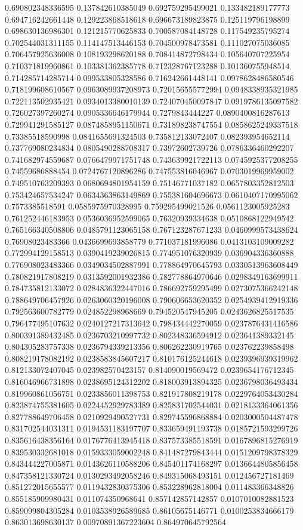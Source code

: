 \begin{table}
\begin{tabu}
\begin{sparkline}{10}
0.690802348336595 0.137842610385049 0.692759295499021 0.133482189177773 0.694716242661448 0.129223868518618 0.696673189823875 0.125119796198899 0.698630136986301 0.121215770625833 0.700587084148728 0.117549235795274 0.702544031311155 0.114147513446153 0.704500978473581 0.111027075036085 0.706457925636008 0.108193298620188 0.708414872798434 0.105640707225954 0.710371819960861 0.103381362385778 0.712328767123288 0.101360755948514 0.714285714285714 0.099533805328586 0.716242661448141 0.0978628486580546 0.718199608610567 0.0963089937208973 0.720156555772994 0.0948338935321985 0.722113502935421 0.0934013380010139 0.724070450097847 0.0919786135097582 0.726027397260274 0.0905336646179944 0.7279843444227 0.0890400816287613 0.729941291585127 0.0874858951150671 0.731898238747554 0.0858625249337518 0.73385518590998 0.0841655691324503 0.735812133072407 0.082393954652114 0.737769080234834 0.0805490288708317 0.73972602739726 0.0786336460292207 0.741682974559687 0.0766479971751748 0.743639921722113 0.0745925377208255 0.74559686888454 0.0724767120896286 0.747553816046967 0.0703019969959002 0.749510763209393 0.0680694801954159 0.75146771037182 0.0657803352812503 0.753424657534247 0.0634363863149869 0.755381604696673 0.0610407170995062 0.7573385518591 0.0585975970328995 0.759295499021526 0.0561123005925283 0.761252446183953 0.0536036952599065 0.76320939334638 0.0510868122949542 0.765166340508806 0.0485791123065158 0.767123287671233 0.0460999573438624 0.76908023483366 0.0436699693858779 0.771037181996086 0.0413103109009282 0.772994129158513 0.0390419239026815 0.774951076320939 0.036904336360888 0.776908023483366 0.0349034502887991 0.778864970645793 0.0330513963608449 0.780821917808219 0.0313592001932386 0.782778864970646 0.0298349163699911 0.784735812133072 0.0284836322447016 0.786692759295499 0.0273075366242148 0.788649706457926 0.0263060320196008 0.790606653620352 0.0254939412919336 0.792563600782779 0.024852298968669 0.794520547945205 0.0243626825517535 0.796477495107632 0.0240127217313642 0.798434442270059 0.0237876431416586 0.800391389432485 0.0236703210997732 0.802348336594912 0.023641389332145 0.804305283757338 0.0236794339213356 0.806262230919765 0.023762239858498 0.808219178082192 0.0238583845607217 0.810176125244618 0.0239396939319962 0.812133072407045 0.023982570423157 0.814090019569472 0.0239654176712345 0.816046966731898 0.0238695124312202 0.818003913894325 0.0236798036493434 0.819960861056751 0.0233856011398753 0.821917808219178 0.0229764053430284 0.823874755381605 0.0224452929783389 0.825831702544031 0.0218133364061356 0.827788649706458 0.0210929490527731 0.829745596868884 0.0203000504487478 0.831702544031311 0.0194531183197707 0.833659491193738 0.0185721593299726 0.835616438356164 0.0176776413945418 0.837573385518591 0.0167896815276919 0.839530332681018 0.0159333059002248 0.841487279843444 0.0151209798378329 0.843444227005871 0.0143626110588206 0.845401174168297 0.0136644805856458 0.847358121330724 0.0130293492058246 0.849315068493151 0.012456727181469 0.851272015655577 0.0119432830375306 0.853228962818004 0.011483366348826 0.855185909980431 0.011074350968641 0.857142857142857 0.0107010082881523 0.859099804305284 0.0103538926589685 0.86105675146771 0.0100253834666179 0.863013698630137 0.00970891367223604 0.864970645792564 
\end{sparkline}
\end{tabu}
\end{table}
